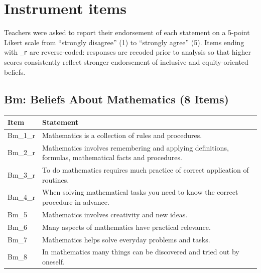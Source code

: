 \documentclass[
  man,
  floatsintext,
  longtable,
  nolmodern,
  notxfonts,
  notimes,
  colorlinks=true,linkcolor=blue,citecolor=blue,urlcolor=blue]{apa7}
\begin{document}
\normalsize

\section{Instrument items}\label{apx-items}

Teachers were asked to report their endorsement of each statement on a
5-point Likert scale from ``strongly disagree'' (1) to ``strongly
agree'' (5). Items ending with \texttt{\_r} are reverse-coded: responses
are recoded prior to analysis so that higher scores consistently reflect
stronger endorsement of inclusive and equity-oriented beliefs.

\subsection{Bm: Beliefs About Mathematics (8
Items)}\label{bm-beliefs-about-mathematics-8-items}

\fontsize{10.5pt}{12.6pt}\selectfont

\begin{table}

{\caption{{Beliefs about mathematics items.}{\label{tbl-item-bm}}}
\vspace{-20pt}}

\begin{longtable}[]{@{}
  >{\raggedright\arraybackslash}p{}
  >{\raggedright\arraybackslash}p{}@{}}
\toprule\noalign{}
\begin{minipage}[b]{\linewidth}\raggedright
Item
\end{minipage} & \begin{minipage}[b]{\linewidth}\raggedright
Statement
\end{minipage} \\
\midrule\noalign{}
\endhead
\bottomrule\noalign{}
\endlastfoot
Bm\_1\_r & Mathematics is a collection of rules and procedures. \\
Bm\_2\_r & Mathematics involves remembering and applying definitions,
formulas, mathematical facts and procedures. \\
Bm\_3\_r & To do mathematics requires much practice of correct
application of routines. \\
Bm\_4\_r & When solving mathematical tasks you need to know the correct
procedure in advance. \\
Bm\_5 & Mathematics involves creativity and new ideas. \\
Bm\_6 & Many aspects of mathematics have practical relevance. \\
Bm\_7 & Mathematics helps solve everyday problems and tasks. \\
Bm\_8 & In mathematics many things can be discovered and tried out by
oneself. \\
\end{longtable}

\end{table}
\end{document}
